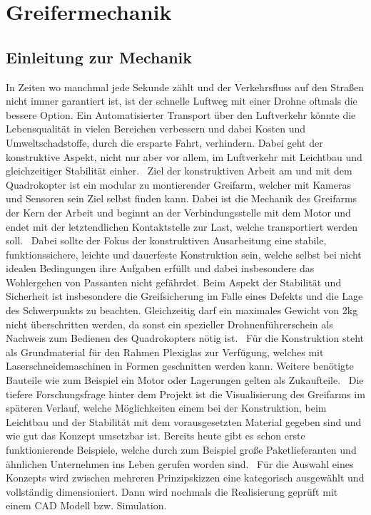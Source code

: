 \chapter{Greifermechanik}
\section{Einleitung zur Mechanik}

In Zeiten wo manchmal jede Sekunde zählt und der Verkehrsfluss auf den Straßen nicht immer garantiert ist, ist der schnelle Luftweg mit einer Drohne oftmals die bessere Option. Ein Automatisierter Transport über den Luftverkehr könnte die Lebensqualität in vielen Bereichen verbessern und dabei Kosten und Umweltschadstoffe, durch die ersparte Fahrt, verhindern. Dabei geht der konstruktive Aspekt, nicht nur aber vor allem,
im Luftverkehr mit Leichtbau und gleichzeitiger Stabilität einher.
\
Ziel der konstruktiven Arbeit am und mit dem Quadrokopter ist ein modular zu montierender Greifarm, welcher mit Kameras und Sensoren sein Ziel selbst finden kann. Dabei ist die Mechanik des Greifarms der Kern der Arbeit und beginnt an der Verbindungsstelle mit dem Motor und endet mit der letztendlichen
Kontaktstelle zur Last, welche transportiert werden soll.
\
Dabei sollte der Fokus der konstruktiven Ausarbeitung eine stabile, funktionssichere, leichte und dauerfeste Konstruktion sein, welche selbst bei nicht idealen Bedingungen ihre Aufgaben erfüllt und dabei insbesondere das Wohlergehen von Passanten nicht gefährdet. Beim Aspekt der Stabilität und Sicherheit ist insbesondere die Greifsicherung im Falle eines Defekts und die Lage des Schwerpunkts zu beachten. Gleichzeitig darf ein maximales Gewicht von 2kg nicht überschritten werden, da sonst
ein spezieller Drohnenführerschein als Nachweis zum Bedienen des Quadrokopters nötig ist.
\
Für die Konstruktion steht als Grundmaterial für den Rahmen Plexiglas zur Verfügung, welches mit Laserschneidemaschinen in Formen geschnitten werden kann. Weitere benötigte Bauteile wie zum Beispiel ein Motor oder Lagerungen gelten als Zukaufteile.
\
Die tiefere Forschungsfrage hinter dem Projekt ist die Visualisierung des Greifarms im späteren Verlauf, welche Möglichkeiten einem bei der Konstruktion, beim Leichtbau
und der Stabilität mit dem vorausgesetzten Material gegeben sind und wie gut das Konzept umsetzbar ist. Bereits heute gibt es schon erste funktionierende Beispiele, welche durch zum Beispiel große Paketlieferanten und ähnlichen Unternehmen ins Leben gerufen worden sind.
\
Für die Auswahl eines Konzepts wird zwischen mehreren Prinzipskizzen eine kategorisch ausgewählt und vollständig dimensioniert. Dann wird nochmals die Realisierung geprüft mit einem CAD Modell bzw. Simulation.


